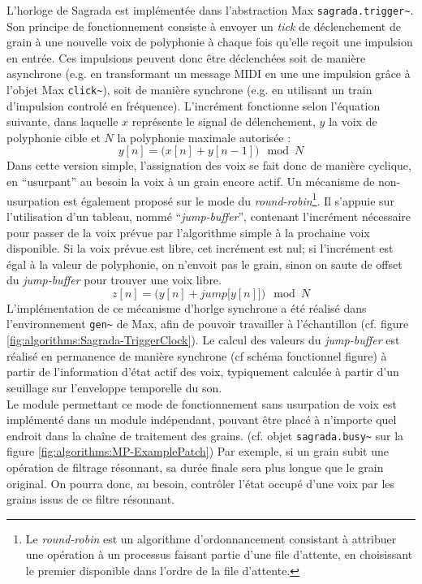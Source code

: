 \noindent L'horloge de Sagrada est implémentée dans l'abstraction Max \verb|sagrada.trigger~|. Son principe de fonctionnement consiste à envoyer un \textit{tick} de déclenchement de grain à une nouvelle voix de polyphonie à chaque fois qu'elle reçoit une impulsion en entrée. Ces impulsions peuvent donc être déclenchées soit de manière asynchrone (e.g. en transformant un message \gls{MIDI} en une une impulsion grâce à l'objet Max \verb|click~|), soit de manière synchrone (e.g. en utilisant un train d'impulsion controlé en fréquence). L'incrément fonctionne selon l'équation suivante, dans laquelle $x$ représente le signal de délenchement, $y$ la voix de polyphonie cible et $N$ la polyphonie maximale autorisée :
$$ y[n] = \big(x[n] + y[n - 1]\big) \mod N $$
\noindent Dans cette version simple, l'assignation des voix se fait donc de manière cyclique, en ``usurpant'' au besoin la voix à un grain encore actif. Un mécanisme de non-usurpation est également proposé sur le mode du \textit{round-robin}\footnote{Le \textit{round-robin} est un algorithme d'ordonnancement consistant à attribuer une opération à un processus faisant partie d'une file d'attente, en choisissant le premier disponible dans l'ordre de la file d'attente.}. Il s'appuie sur l'utilisation d'un tableau, nommé ``\textit{jump-buffer}'', contenant l'incrément nécessaire pour passer de la voix prévue par l'algorithme simple à la prochaine voix disponible. Si la voix prévue est libre, cet incrément est nul; si l'incrément est égal à la valeur de polyphonie, on n'envoit pas le grain, sinon on saute de offset du \textit{jump-buffer }pour trouver une voix libre.
$$ z[n] = \Big(y[n] + jump\big[y[n]\big]\Big)\mod N $$
\noindent L'implémentation de ce mécanisme d'horlge synchrone a été réalisé dans l'environnement \verb|gen~| de Max, afin de pouvoir travailler à l'échantillon (cf. figure \ref{fig:algorithms:Sagrada-TriggerClock}). Le calcul des valeurs du \textit{jump-buffer} est réalisé en permanence de manière synchrone (cf schéma fonctionnel figure) à partir de l'information d'état actif des voix, typiquement calculée à partir d'un seuillage sur l'enveloppe temporelle du son.\\
\indent Le module permettant ce mode de fonctionnement sans usurpation de voix est implémenté dans un module indépendant, pouvant être placé à n'importe quel endroit dans la chaîne de traitement des grains. (cf. objet \verb|sagrada.busy~| sur la figure \ref{fig:algorithms:MP-ExamplePatch}) Par exemple, si un grain subit une opération de filtrage résonnant, sa durée finale sera plus longue que le grain original. On pourra donc, au besoin, contrôler l'état occupé d'une voix par les grains issus de ce filtre résonnant.

